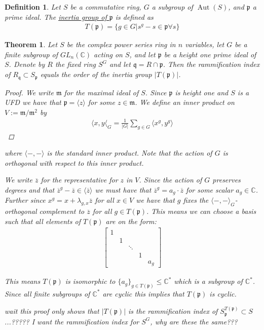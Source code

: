 \documentclass[11pt, a4paper, english]{article}
\numberwithin{prop}{section}
\numberwithin{lemma}{section}
\newtheorem{theorem}{Theorem}
\numberwithin{theorem}{section}
\newtheorem{defin}{Definition}
\numberwithin{defin}{section}
\numberwithin{example}{section}
\newcommand{\C}{\mathbb{C}}
\DeclareMathOperator{\Aut}{Aut}
\begin{document}
\begin{defin}
Let $S$ be a commutative ring, $G$ a subgroup of $\Aut(S)$, and $\mathfrak{p}$ a prime ideal. The \underline{inertia group of $\mathfrak{p}$} is defined as
\begin{align*}
T(\mathfrak{p}) = \{ g \in G | s^g - s \in \mathfrak{p} \forall s \}
\end{align*}
\end{defin}

\begin{theorem}
Let $S$ be the complex power series ring in $n$ variables, let $G$ be  a finite subgroup of $GL_n(\C)$ acting on $S$, and let $\mathfrak{p}$ be a height one prime ideal of $S$. Denote by $R$ the fixed ring $S^G$ and let $\mathfrak{q} = R \cap \mathfrak{p}$. Then the rammification index of $R_\mathfrak{q} \subset S_\mathfrak{p}$ equals the order of the inertia group $|T(\mathfrak{p})|$.

\begin{proof}
We write $\mathfrak{m}$ for the maximal ideal of $S$. Since $\mathfrak{p}$ is height one and $S$ is a UFD we have that $\mathfrak{p} = \langle z \rangle$ for some $z \in \mathfrak{m}$. We define an inner product on $V := \mathfrak{m}/\mathfrak{m}^2$ by
\begin{align*}
\langle x, y \langle_G = \frac{1}{|G|} \sum_{g \in G} \langle x^g,  y^g \rangle
\end{align*}
\end{proof}
where $\langle -,- \rangle$ is the standard inner product. Note that the action of $G$ is orthogonal with respect to this inner product.

We write $\overline{z}$ for the representative for $z$ in $V$. Since the action of $G$ preserves degrees and that $\overline{z}^g - \overline{z} \in \langle \overline{z} \rangle$ we must have that $\overline{z}^g = a_g \cdot \overline{z}$ for some scalar $a_g \in \C$. Further since $x^g = x + \lambda_{g,x}\overline{z}$ for all $x \in V$ we have that $g$ fixes the $\langle -,- \rangle_G$-orthogonal complement to $\overline{z}$ for all $g \in T(\mathfrak{p})$. This means we can choose a basis such that all elements of $T(\mathfrak{p})$ are on the form:
\begin{align*}
\begin{bmatrix}
1\\
& 1\\
&& \ddots\\
&&&1\\
&&&& a_g
\end{bmatrix}
\end{align*}

This means $T(\mathfrak{p})$ is isomorphic to $\{ a_g \}_{g \in T(\mathfrak{p})} \leq \C^*$ which is a subgroup of $\C^*$. Since all finite subgroups of $\C^*$ are cyclic this implies that $T(\mathfrak{p})$ is cyclic. 

{\color{red} wait this proof only shows that $|T(\mathfrak{p})|$ is the rammification index of $S^{T(\mathfrak{p})}_\mathfrak{p} \subset S$...????? I want the rammification index for $S^G$, why are these the same???}

\end{theorem}
\end{document}
